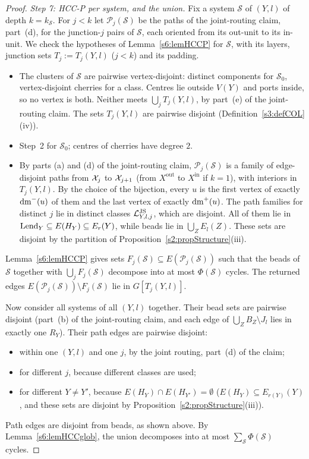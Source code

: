 \begin{proof}
\emph{Step 7: HCC-P per system, and the union.} Fix a system $\mathcal S$ of $(Y,l)$ of depth $k=k_{\mathcal S}$. For $j<k$ let $\mathcal P_j(\mathcal S)$ be the paths of the joint-routing claim, part~(d), for the junction-$j$ pairs of $\mathcal S$, each oriented from its out-unit to its in-unit. We check the hypotheses of Lemma~\ref{s6:lemHCCP} for $\mathcal S$, with its layers, junction sets $T_j:=T_j(Y,l)$ ($j<k$) and its padding.
\begin{itemize}
\item[(D)] The clusters of $\mathcal S$ are pairwise vertex-disjoint: distinct components for $\mathcal S_0$, vertex-disjoint cherries for a class. Centres lie outside $V(Y)$ and ports inside, so no vertex is both. Neither meets $\bigcup_jT_j(Y,l)$, by part~(e) of the joint-routing claim. The sets $T_j(Y,l)$ are pairwise disjoint (Definition~\ref{s3:defCOL}(iv)).
\item[(P)] Step~2 for $\mathcal S_0$; centres of cherries have degree $2$.
\item[(JC-P)] By parts (a) and (d) of the joint-routing claim, $\mathcal P_j(\mathcal S)$ is a family of edge-disjoint paths from $\mathcal{X}_j$ to $\mathcal{X}_{j+1}$ (from $X^{\mathrm{out}}$ to $X^{\mathrm{in}}$ if $k=1$), with interiors in $T_j(Y,l)$. By the choice of the bijection, every $u$ is the first vertex of exactly $\mathrm{dm}^-(u)$ of them and the last vertex of exactly $\mathrm{dm}^+(u)$. The path families for distinct $j$ lie in distinct classes $\mathcal{L}^{\mathrm{JS}}_{Y,l,j}$, which are disjoint. All of them lie in $\mathrm{Lend}_Y\subseteq E(H_Y)\subseteq E_{r}(Y)$, while beads lie in $\bigcup_ZE_l(Z)$. These sets are disjoint by the partition of Proposition~\ref{s2:propStructure}(iii).
\end{itemize}
Lemma~\ref{s6:lemHCCP} gives sets $F_j(\mathcal S)\subseteq E(\mathcal P_j(\mathcal S))$ such that the beads of $\mathcal S$ together with $\bigcup_jF_j(\mathcal S)$ decompose into at most $\Phi(\mathcal S)$ cycles. The returned edges $E(\mathcal P_j(\mathcal S))\setminus F_j(\mathcal S)$ lie in $G[T_j(Y,l)]$.

Now consider all systems of all $(Y,l)$ together. Their bead sets are pairwise disjoint (part~(b) of the joint-routing claim, and each edge of $\bigcup_ZB_Z\setminus J_l$ lies in exactly one $R_Y$). Their path edges are pairwise disjoint:
\begin{itemize}
\item within one $(Y,l)$ and one $j$, by the joint routing, part~(d) of the claim;
\item for different $j$, because different classes are used;
\item for different $Y\neq Y'$, because $E(H_Y)\cap E(H_{Y'})=\emptyset$ ($E(H_Y)\subseteq E_{r(Y)}(Y)$, and these sets are disjoint by Proposition~\ref{s2:propStructure}(iii)).
\end{itemize}
Path edges are disjoint from beads, as shown above. By Lemma~\ref{s6:lemHCCglob}, the union decomposes into at most $\sum_{\mathcal S}\Phi(\mathcal S)$ cycles.


\end{proof}
